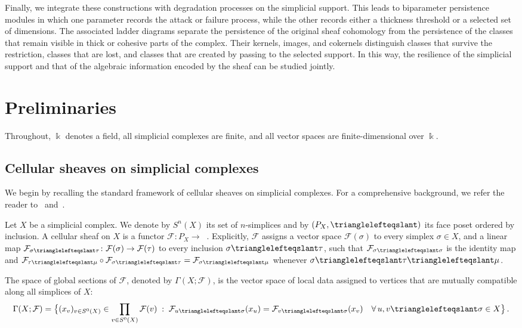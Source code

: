 \documentclass[reqno,12pt]{amsart}
\newcommand{\face}{{\trianglelefteqslant}}
\DeclareMathOperator{\vect}{\mathbf{vect}_\Bbbk}
\newcommand{\0}{\mathbf 0}
\theoremstyle{definition}
\begin{document}
Finally, we integrate these constructions with degradation processes on the simplicial support. This leads to biparameter persistence modules in which one parameter records the attack or failure process, while the other records either a thickness threshold or a selected set of dimensions. The associated ladder diagrams separate the persistence of the original sheaf cohomology from the persistence of the classes that remain visible in thick or cohesive parts of the complex. Their kernels, images, and cokernels distinguish classes that survive the restriction, classes that are lost, and classes that are created by passing to the selected support. In this way, the resilience of the simplicial support and that of the algebraic information encoded by the sheaf can be studied jointly.

\section{Preliminaries}\label{Sec:Prelim}

Throughout, $\Bbbk$ denotes a field, all simplicial complexes are finite, and all vector spaces are finite-dimensional over $\Bbbk$. 

\subsection{Cellular sheaves on simplicial complexes}
\label{Sec:CellularSheaves}We begin by recalling the standard framework of cellular sheaves on simplicial complexes. For a comprehensive background, we refer the reader to~\cite{Curry14} and~\cite{Hansen20}.

Let $X$ be a simplicial complex. We denote by $S^n(X)$ its set of $n$-simplices and by $(P_X,\face)$ its face poset ordered by inclusion. A cellular sheaf on $X$ is a functor $\mathcal{F}\colon P_X\to \vect$. Explicitly, $\mathcal{F}$ assigns a vector space $\mathcal{F}(\sigma)$ to every simplex $\sigma\in X$, and a linear map $\mathcal{F}_{\sigma\face\tau}\colon \mathcal{F}(\sigma)\to \mathcal{F}(\tau)$ to every inclusion $\sigma\face\tau$, such that $\mathcal{F}_{\sigma\face\sigma}$ is the identity map and $\mathcal{F}_{\tau\face\mu} \circ \mathcal{F}_{\sigma\face\tau} = \mathcal{F}_{\sigma\face\mu}$ whenever $\sigma\face\tau\face\mu$.

The space of global sections of $\mathcal{F}$, denoted by $\Gamma(X;\mathcal{F})$, is the vector space of local data assigned to vertices that are mutually compatible along all simplices of $X$: 
\[
\Gamma(X;\mathcal{F}) = \big\{ (x_v)_{v \in S^0(X)} \in \prod_{v \in S^0(X)} \mathcal{F}(v) \; : \; \mathcal{F}_{u\face \sigma}(x_u) = \mathcal{F}_{v\face \sigma}(x_v) \quad \forall \, u,v\face \sigma \in X \big\}\,.
\]
\end{document}
